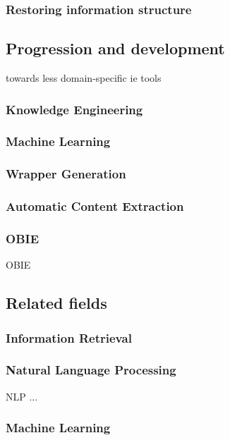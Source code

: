 \subsubsection{Restoring information structure}

\newpage
\subsection{Progression and development}
towards less domain-specific ie tools

\subsubsection{Knowledge Engineering}

\subsubsection{Machine Learning}

\subsubsection{Wrapper Generation}

\subsubsection{Automatic Content Extraction}

\subsubsection{\acrlong{OBIE}}
\gls{OBIE}

\newpage
\subsection{Related fields}

\subsubsection{Information Retrieval}

\subsubsection{Natural Language Processing}
\gls{NLP} ...

\subsubsection{Machine Learning}
